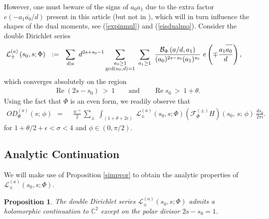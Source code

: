 \documentclass[11pt,reqno]{amsart}
\newtheorem{prop}[thm]{Proposition}
\theoremstyle{definition}
\theoremstyle{definition}
\theoremstyle{remark}
\newcommand{\C}{\ensuremath{\mathbb{C}}}
\numberwithin{equation}{section}
\DeclareMathOperator{\re}{Re}
\newcommand{\ovA}[1]{\overline{#1\raisebox{3mm}{}}}
\begin{document}
However, one must beware of  the signs of $a_{0}a_{1}$ due to the extra factor $e(-a_{1}\overline{a_{0}}/d)$ present in this article (but not in  \cite{Kw23, Kw23a+}), which will in turn influence the shapes of the dual moments, see  (\ref{expinmul}) and  (\ref{eisdualmo}). Consider the double Dirichlet series
\begin{align}\label{specLser}
	\mathcal{L}^{(a)}_{\pm}\left(s_{0}, s; \Phi \right) \ \ &:= \  \  \sum_{d \mid a} \  d^{2s+s_{0}-1}
	\sum_{\substack{a_{0} \ge 1 \\ \gcd(a_{0}, d)=1}}  \ \sum_{a_{1}\ge 1 }  \ \frac{\mathcal{B}_{\Phi}\left( a/d, a_{1}   \right)}{(a_{0})^{2s-s_{0}} (a_{1})^{s_{0}}}\  e\left(\mp \frac{a_{1}\ovA{a_{0}}}{d}\right),
\end{align}
which converges absolutely on the region  
\begin{align}\label{regAC}
	\re (2s-s_{0}) \ > \ 1 \hspace{20pt} \text{ and  } \hspace{20pt}\re s_{0} \ > \ 1+\theta. 
\end{align}
 Using the fact that $\Phi$ is an even form, we readily observe  that
\begin{align}
	OD_{\Phi}^{(a)}(s;\, \phi) \ \ = \ \   &\frac{a^{-s}}{2} \  \sum_{\pm} \  \int_{(1+\theta+2\epsilon)} \  	\mathcal{L}^{(a)}_{\pm}\left(s_{0}, s; \Phi \right)   (\mathcal{F}_{\Phi}^{(\pm)}H)\left(s_{0}, \, s; \,  \phi\right) \ \frac{ds_{0}}{2\pi i}. 
\end{align}
for $ 1+ \theta/2  +\epsilon< \sigma < 4$  and   $\phi\in (0, \pi/2)$. 




 	

 	
 	
 	
  
 \subsection{Analytic Continuation}
We will make use of Proposition \ref{simpvor} to obtain  the analytic properties of  $\mathcal{L}_{\pm}^{(a)}\left(s_{0}, s; \Phi\right)$.  



\begin{prop}\label{anacondtwi}
	The double Dirichlet series $\mathcal{L}_{\pm}^{(a)}(s_{0},s; \Phi)$ admits a holomorphic   continuation to $\C^2$  except on the polar divisor $2s-s_{0}=1$.  
\end{prop}
\end{document}

